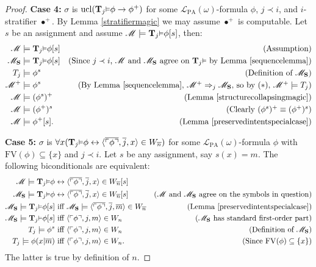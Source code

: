 \documentclass[reqno]{article}
\theoremstyle{definition}
\def\L{\mathscr{L}}
\def\M{\mathscr{M}}
\def\T{\mathbf{T}}
\def\S{\mathbf{S}}
\def\FV{\mathrm{FV}}
\def\LPA{\L_{\mathrm{PA}}}
\def\myequiv{\Rightarrow}
\renewcommand{\Pr}[1]{\T_{#1}\mbox{\small${\vDash}$}}
\newcommand{\ucl}[1]{\mathrm{ucl}(#1)}
\newcommand{\case}[1]{\textbf{Case #1:}}
\begin{document}
\begin{proof}
\item
\case4
$\sigma$ is $\ucl{\Pr j\phi\rightarrow\phi^+}$ for some $\LPA(\omega)$-formula $\phi$, $j\prec i$,
and $i$-stratifier $\bullet^+$.
By Lemma \ref{stratifiermagic} we may assume $\bullet^+$ is computable.
Let $s$ be an assignment and assume $\M\models \Pr j\phi[s]$, then:
\begin{align*}
\M &\models \Pr j\phi[s]
  &\mbox{(Assumption)}\\
\M_\S &\models \Pr j\phi[s]
  &\mbox{(Since $j\prec i$, $\M$ and $\M_\S$ agree on $\Pr j$ by Lemma \ref{sequencelemma})}\\
T_j &\models \phi^s
  &\mbox{(Definition of $\M_\S$)}\\
\M^+ &\models \phi^s
  &\mbox{(By Lemma \ref{sequencelemma}, $\M^+\myequiv_j\M_\S$, so by ($*$), $\M^+\models T_j$)}\\
\M &\models (\phi^s)^+
  &\mbox{(Lemma \ref{structurecollapsingmagic})}\\
\M &\models (\phi^+)^s
  &\mbox{(Clearly $(\phi^s)^+\equiv(\phi^+)^s$)}\\
\M &\models \phi^+[s].
  &\mbox{(Lemma \ref{preservedintentspecialcase})}
\end{align*}


\item
\case5
$\sigma$ is $\forall x(\Pr j\phi\leftrightarrow\langle\overline{\ulcorner\phi\urcorner},\overline j,
x\rangle\in W_{\overline n})$ for some $\LPA(\omega)$-formula $\phi$ with $\FV(\phi)\subseteq\{x\}$
and $j\prec i$.
Let $s$ be any assignment, say $s(x)=m$.
The following biconditionals are equivalent:
\begin{align*}
\M \models \Pr j\phi&\leftrightarrow
\langle\overline{\ulcorner\phi\urcorner}, \overline j,x\rangle\in W_{\overline n}[s]\\
\M_\S \models \Pr j\phi&\leftrightarrow
\langle\overline{\ulcorner\phi\urcorner}, \overline j,x\rangle\in W_{\overline n}[s]
  &\mbox{($\M$ and $\M_\S$ agree on the symbols in question)}\\
\M_\S \models \Pr j\phi[s]&\mbox{ iff }\M_\S\models
\langle\overline{\ulcorner\phi\urcorner}, \overline j,\overline m\rangle\in W_{\overline n}
  &\mbox{(Lemma \ref{preservedintentspecialcase})}\\
\M_\S \models \Pr j\phi[s]&\mbox{ iff }
\langle\ulcorner\phi\urcorner,j,m\rangle\in W_n
  &\mbox{($\M_\S$ has standard first-order part)}\\
T_j \models \phi^s&\mbox{ iff }
\langle\ulcorner\phi\urcorner,j,m\rangle\in W_n
  &\mbox{(Definition of $\M_\S$)}\\
T_j \models \phi(x|\overline m)&\mbox{ iff }
\langle\ulcorner\phi\urcorner,j,m\rangle\in W_n.
  &\mbox{(Since $\FV(\phi)\subseteq\{x\}$)}
\end{align*}
The latter is true by definition of $n$.


\end{proof}
\end{document}
